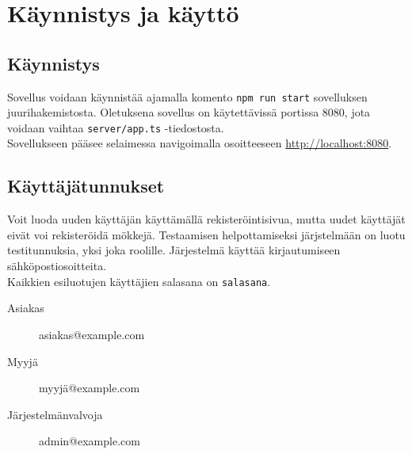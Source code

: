 \chapter{Käynnistys ja käyttö}

\section{Käynnistys}

Sovellus voidaan käynnistää ajamalla komento \texttt{npm run start} sovelluksen juurihakemistosta. Oletuksena sovellus on käytettävissä portissa 8080, jota voidaan vaihtaa \texttt{server/app.ts} -tiedostosta.\\

Sovellukseen pääsee selaimessa navigoimalla osoitteeseen \href{http://localhost:8080}{http://localhost:8080}.

\section{Käyttäjätunnukset}

Voit luoda uuden käyttäjän käyttämällä rekisteröintisivua, mutta uudet käyttäjät eivät voi rekisteröidä mökkejä. Testaamisen helpottamiseksi järjstelmään on luotu testitunnuksia, yksi joka roolille. Järjestelmä käyttää kirjautumiseen sähköpostiosoitteita.\\

\noindent
Kaikkien esiluotujen käyttäjien salasana on \texttt{salasana}.\\

\begin{description}
	\item[Asiakas] asiakas@example.com
	\item[Myyjä] myyjä@example.com
	\item[Järjestelmänvalvoja] admin@example.com
\end{description}